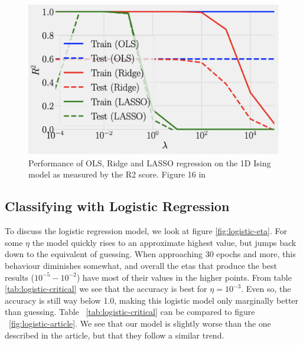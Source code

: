 \begin{figure}[H]
    \centering
\includegraphics[width = 0.6\paperwidth]{figures/R2_article.png}
\caption{Performance of OLS, Ridge and LASSO regression on the 1D Ising model as measured by the 
    R2 score. Figure 16 in \cite{HighBias}} 
\label{fig:regression-r2-article}

\end{figure}
\subsection{Classifying with Logistic Regression}
To discuss the logistic regression model, 
we look at figure \ref{fig:logistic-eta}. For some $\eta$ the model 
quickly rises to an approximate highest value, but jumps back down to 
the equivalent of guessing.
When approaching 30 epochs and more, this behaviour 
diminishes somewhat, and overall the etas that produce the best results 
($10^{-5} - 10^{-2}$) have most of their values in the higher points.
From table \ref{tab:logistic-critical} we see that the accuracy is best
for \(\eta = 10^{-3}\). Even so, the accuracy is still 
way below 1.0, making this logistic model only marginally better than guessing. 
Table ~\ref{tab:logistic-critical} can be compared to figure 
~\ref{fig:logistic-article}. We see that our model is slightly 
worse than the one described in the article, but that they 
follow a similar trend.

